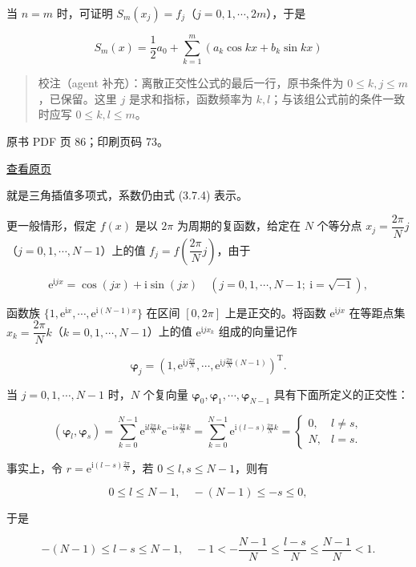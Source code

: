 当 \(n=m\) 时，可证明 \(S_m(x_j)=f_j\)（\(j=0,1,\cdots,2m\)），于是

\[
S_m(x)=\frac12a_0+\sum_{k=1}^m(a_k\cos kx+b_k\sin kx)
\]

\begin{quote}
校注（agent 补充）：离散正交性公式的最后一行，原书条件为 \(0\leqslant k,j\leqslant m\)，已保留。这里 \(j\) 是求和指标，函数频率为 \(k,l\)；与该组公式前的条件一致时应写 \(0\leqslant k,l\leqslant m\)。
\end{quote}

\clearpage

原书 PDF 页 86；印刷页码 73。

\href{source-images/pdf-086.jpeg}{查看原页}

就是三角插值多项式，系数仍由式 (3.7.4) 表示。

更一般情形，假定 \(f(x)\) 是以 \(2\pi\) 为周期的复函数，给定在 \(N\) 个等分点 \(x_j=\dfrac{2\pi}{N}j\)（\(j=0,1,\cdots,N-1\)）上的值 \(f_j=f\left(\dfrac{2\pi}{N}j\right)\)，由于

\[
\mathrm e^{\mathrm ijx}=\cos(jx)+\mathrm i\sin(jx)\quad(j=0,1,\cdots,N-1;\ \mathrm i=\sqrt{-1}),
\]

函数族 \(\{1,\mathrm e^{\mathrm ix},\cdots,\mathrm e^{\mathrm i(N-1)x}\}\) 在区间 \([0,2\pi]\) 上是正交的。将函数 \(\mathrm e^{\mathrm ijx}\) 在等距点集 \(x_k=\dfrac{2\pi}{N}k\)（\(k=0,1,\cdots,N-1\)）上的值 \(\mathrm e^{\mathrm ijx_k}\) 组成的向量记作

\[
\boldsymbol\varphi_j=\left(1,\mathrm e^{\mathrm ij\frac{2\pi}{N}},\cdots,\mathrm e^{\mathrm ij\frac{2\pi}{N}(N-1)}\right)^{\mathrm T}.
\]

当 \(j=0,1,\cdots,N-1\) 时，\(N\) 个复向量 \(\boldsymbol\varphi_0,\boldsymbol\varphi_1,\cdots,\boldsymbol\varphi_{N-1}\) 具有下面所定义的正交性：

\[
(\boldsymbol\varphi_l,\boldsymbol\varphi_s)=\sum_{k=0}^{N-1}\mathrm e^{\mathrm il\frac{2\pi}{N}k}\mathrm e^{-\mathrm is\frac{2\pi}{N}k}=\sum_{k=0}^{N-1}\mathrm e^{\mathrm i(l-s)\frac{2\pi}{N}k}=\begin{cases}0,&l\ne s,\\N,&l=s.\end{cases}\tag{3.7.5}
\]

事实上，令 \(r=\mathrm e^{\mathrm i(l-s)\frac{2\pi}{N}}\)，若 \(0\leqslant l,s\leqslant N-1\)，则有

\[
0\leqslant l\leqslant N-1,\quad-(N-1)\leqslant-s\leqslant0,
\]

于是

\[
-(N-1)\leqslant l-s\leqslant N-1,\quad-1<-\frac{N-1}{N}\leqslant\frac{l-s}{N}\leqslant\frac{N-1}{N}<1.
\]

